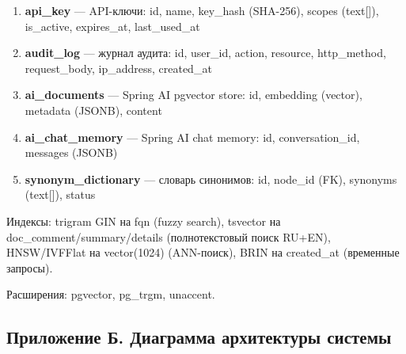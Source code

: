 {\begin{enumerate}
  \item \textbf{api\_key} — API-ключи: id, name, key\_hash (SHA-256), scopes (text[]), is\_active, expires\_at, last\_used\_at
  \item \textbf{audit\_log} — журнал аудита: id, user\_id, action, resource, http\_method, request\_body, ip\_address, created\_at
  \item \textbf{ai\_documents} — Spring AI pgvector store: id, embedding (vector), metadata (JSONB), content
  \item \textbf{ai\_chat\_memory} — Spring AI chat memory: id, conversation\_id, messages (JSONB)
  \item \textbf{synonym\_dictionary} — словарь синонимов: id, node\_id (FK), synonyms (text[]), status
\end{enumerate}

Индексы: trigram GIN на fqn (fuzzy search), tsvector на doc\_comment/summary/details (полнотекстовый поиск RU+EN), HNSW/IVFFlat на vector(1024) (ANN-поиск), BRIN на created\_at (временные запросы).

Расширения: pgvector, pg\_trgm, unaccent.}

\subsection*{Приложение Б. Диаграмма архитектуры системы}

